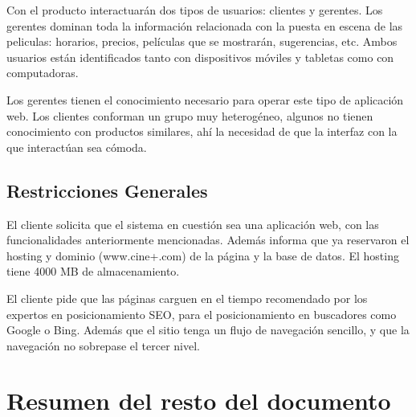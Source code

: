 
Con el producto interactuarán dos tipos de usuarios: clientes y gerentes. Los gerentes dominan toda la información relacionada con la puesta en escena de las peliculas: horarios, precios, películas que se mostrarán, sugerencias, etc. Ambos usuarios están identificados tanto con dispositivos móviles y tabletas como con computadoras.

Los gerentes tienen el conocimiento necesario para operar este tipo de aplicación web. Los clientes conforman un grupo muy heterogéneo, algunos no tienen conocimiento con productos similares, ahí la necesidad de que la interfaz con la que interactúan sea cómoda.

\subsection{Restricciones Generales}

El cliente solicita que el sistema en cuestión sea una aplicación web, con las funcionalidades anteriormente mencionadas. Además informa que ya reservaron el hosting y dominio (www.cine+.com) de la página y la base de datos. El hosting tiene 4000 MB de almacenamiento.

El cliente pide que las páginas carguen en el tiempo recomendado por los expertos en posicionamiento SEO, para el posicionamiento en buscadores como Google o Bing. Además que el sitio tenga un flujo de navegación sencillo, y que la navegación no sobrepase el tercer nivel.

\section{Resumen del resto del documento}

